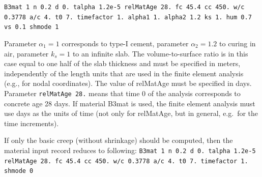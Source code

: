\documentclass[a4paper]{article}
\begin{document}
{\tt B3mat 1 n 0.2 d 0. talpha 1.2e-5 relMatAge 28. fc 45.4 cc 450. w/c 0.3778 a/c 4. t0 7. timefactor 1. alpha1 1. alpha2 1.2 ks 1. hum 0.7 vs 0.1 shmode 1}

Parameter $\alpha_1=1$ corresponds to type-I cement, parameter $\alpha_2=1.2$
to curing in air, parameter $k_s=1$ to an infinite slab. 
The volume-to-surface ratio is in this case 
equal to one half of the slab thickness
and must be specified in meters, independently of the length units that are
used in the finite element analysis (e.g., for nodal coordinates).
The value of relMatAge must be specified in days.
Parameter {\tt relMatAge 28.}  means that time 0
of the analysis corresponds to concrete age 28 days. 
If material B3mat is used, the finite element analysis
must use days as the units of time (not only for relMatAge,
but in general, e.g.\ for the time increments).

If only the basic creep (without shrinkage) should be computed, then
the material input record reduces to following:
{\tt B3mat 1 n 0.2 d 0. talpha 1.2e-5 relMatAge 28. fc 45.4 cc 450. w/c 0.3778 a/c 4. t0 7. timefactor 1. shmode 0}



\end{document}
